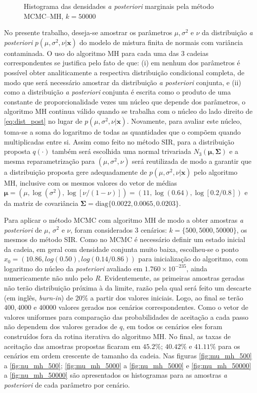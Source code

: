 \begin{figure}[t]
	\caption{Histograma das densidades \textit{a posteriori} marginais pela método MCMC--MH, $k = 50000$}%
\end{figure}

No presente trabalho, deseja-se amostrar os parâmetros $\mu, \sigma^2$ e $\nu$ da distribuição \textit{a posteriori} $p(\mu, \sigma^2, \nu | \bm{x})$ do modelo de mistura finita de normais com variância contaminada. O uso do algoritmo MH para cada uma das 3 cadeias correspondentes se justifica pelo fato de que: (i) em nenhum dos parâmetros é possível obter analiticamente a respectiva distribuição condicional completa, de modo que será necessário amostrar da distribuição \textit{a posteriori} conjunta, e (ii) como a distribuição \textit{a posteriori} conjunta é escrita como o produto de uma constante de proporcionalidade vezes um núcleo que depende dos parâmetros, o algoritmo MH continua válido quando se trabalha com o núcleo do lado direito de \eqref{eq:dist_post} no lugar de $p(\mu, \sigma^2, \nu | \bm{x})$. Novamente, para avaliar este núcleo, toma-se a soma do logaritmo de todas as quantidades que o compõem quando multiplicadas entre si. Assim como feito no método SIR, para a distribuição proposta $q(\cdot)$ também será escolhida uma normal trivariada $N_3(\bm{\mu}, \bm{\Sigma})$ e a mesma reparametrização para $(\mu, \sigma^2, \nu)$ será reutilizada de modo a garantir que a distribuição proposta gere adequadamente de $p(\mu, \sigma^2, \nu | \bm{x})$ pelo algoritmo MH, inclusive com os mesmos valores do vetor de médias $\bm{\mu} = (\mu, \log(\sigma^2), \log[\nu/(1-\nu)]) = (11, \log(0.64), \log[0.2/0.8])$ e da matriz de covariância $\bm{\Sigma} = \textrm{diag}\{0.0022, 0.0065, 0.0203\}$.

Para aplicar o método MCMC com algoritmo MH de modo a obter amostras \textit{a posteriori} de $\mu$, $\sigma^2$ e $\nu$, foram considerados 3 cenários: $k = \{500, 5000, 50000\}$, os mesmos do método SIR. Como no MCMC é necessário definir um estado inicial da cadeia, em geral com densidade conjunta muito baixa, escolheu-se o ponto $x_0 = (10.86, log(0.50), log(0.14/0.86))$ para inicialização do algoritmo, com logaritmo do núcleo da \textit{posteriori} avaliado em $1.760 \times 10^{-235}$, ainda numericamente não nulo pelo \textit{R}. Evidentemente, as primeiras amostras geradas não terão distribuição próxima à da limite, razão pela qual será feito um descarte (em inglês, \textit{burn-in}) de 20\% a partir dos valores iniciais. Logo, ao final se terão $400, 4000$ e $40000$ valores gerados nos cenários correspondentes. Como o vetor de valores uniformes para comparação das probabilidades de aceitação a cada passo não dependem dos valores gerados de $q$, em todos os cenários eles foram construídos fora da rotina iterativa do algoritmo MH. No final, as taxas de aceitação das amostras propostas ficaram em $45.2\%$; $40.42\%$ e $41.11\%$ para os cenários em ordem crescente de tamanho da cadeia. Nas figuras \ref{fig:mu_mh_500} a \ref{fig:nu_mh_500}; \ref{fig:mu_mh_5000} a \ref{fig:nu_mh_5000} e \ref{fig:mu_mh_50000} a \ref{fig:nu_mh_50000} são apresentados os histogramas para as amostras \textit{a posteriori} de cada parâmetro por cenário.


